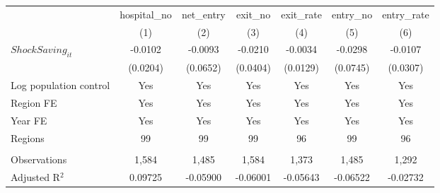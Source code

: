 \begingroup
\centering
\begin{tabular}{lcccccc}
   \toprule
                          & hospital\_no  & net\_entry  & exit\_no  & exit\_rate  & entry\_no  & entry\_rate \\    
                          & (1)           & (2)         & (3)       & (4)         & (5)        & (6)\\  
   \midrule 
   $ShockSaving_{it}$     & -0.0102       & -0.0093     & -0.0210   & -0.0034     & -0.0298    & -0.0107\\   
                          & (0.0204)      & (0.0652)    & (0.0404)  & (0.0129)    & (0.0745)   & (0.0307)\\   
   Log population control & Yes           & Yes         & Yes       & Yes         & Yes        & Yes\\  
   Region FE              & Yes           & Yes         & Yes       & Yes         & Yes        & Yes\\  
   Year FE                & Yes           & Yes         & Yes       & Yes         & Yes        & Yes\\  
   Regions                & 99            & 99          & 99        & 96          & 99         & 96\\  
    \\
   Observations           & 1,584         & 1,485       & 1,584     & 1,373       & 1,485      & 1,292\\  
   Adjusted R$^2$         & 0.09725       & -0.05900    & -0.06001  & -0.05643    & -0.06522   & -0.02732\\  
   \bottomrule
\end{tabular}
\par\endgroup
